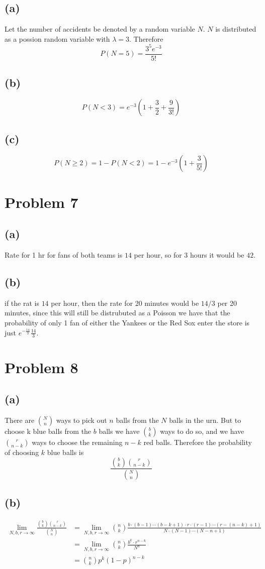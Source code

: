 \subsection*{(a)}
Let the number of accidents be denoted by a random variable
$N$. $N$ is distributed as a possion random variable with
$\lambda=3$. Therefore
$$P(N=5)=\boxed{\frac{3^5e^{-3}}{5!}}$$
\subsection*{(b)}
$$P(N<3)=e^{-3}\left(1+\frac{3}{2}+\frac{9}{3!}\right)$$
\subsection*{(c)}
$$P(N\geq 2)=1-P(N<2)=\boxed{1-e^{-3}\left(1+\frac{3}{5!}\right)}$$
\section*{Problem 7}
\subsection*{(a)}
Rate for 1 hr for fans of both teams is $14$ per hour,
so for 3 hours it would be $\boxed{42}$.
\subsection*{(b)}
if the rat is $14$ per hour, then the rate for 
20 minutes would be $14/3$ per 20 minutes, since this will
still be distrubuted as a Poisson we have that the probability 
of only 1 fan of either the Yankees or the Red Sox enter the store
is just $\boxed{e^{-\frac{14}{3}}\frac{14}{3}}$.
\section*{Problem 8}
\subsection*{(a)}
There are $N\choose n$ ways to pick out $n$ balls from the $N$
balls in the urn. But to choose k blue balls from the $b$ balls
we have $b\choose k$ ways to do so, and we have 
$r\choose n-k$ ways to choose the remaining $n-k$ red balls. Therefore the 
probability of choosing $k$ blue balls is
$$\boxed{\frac{{b\choose k}{r \choose n-k}}{{N\choose n}}}$$
\subsection*{(b)}
\begin{align*}
    \lim_{N,b,r\to \infty}\frac{{b\choose k}{r \choose n-k}}{{N\choose n}}&=
        \lim_{N,b,r\to \infty}{n\choose k}\frac{b\cdot(b-1)\cdots (b-k+1)\cdot r\cdot (r-1)\cdots (r-(n-k)+1)}{N\cdot (N-1)\cdots (N-n+1)}\\
        &=\lim_{N,b,r\to \infty}{n\choose k}\frac{b^k\cdot r^{n-k}}{N^n}\\
        &={n\choose k}p^k(1-p)^{n-k}
\end{align*}

